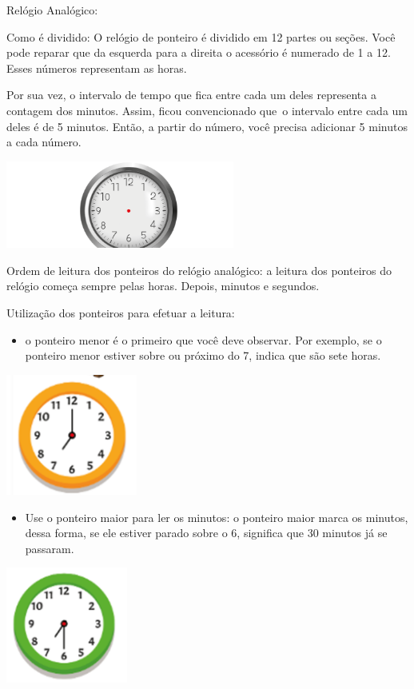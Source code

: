 Relógio Analógico:

Como é dividido: O relógio de ponteiro é dividido em 12 partes ou
seções. Você pode reparar que da esquerda para a direita o acessório é
numerado de 1 a 12. Esses números representam as horas.

Por sua vez, o intervalo de tempo que fica entre cada um deles
representa a contagem dos minutos. Assim, ficou convencionado que~o
intervalo entre cada um deles é de 5 minutos. Então, a partir do número,
você precisa adicionar 5 minutos a cada número.

\includegraphics[width=2.95833in,height=1.13007in]{media/image48.png}

Ordem de leitura dos ponteiros do relógio analógico: a leitura dos
ponteiros do relógio começa sempre pelas horas. Depois, minutos e
segundos.

Utilização dos ponteiros para efetuar a leitura:

\begin{itemize}
\item
  o ponteiro menor é o primeiro que você deve observar. Por exemplo, se
  o ponteiro menor estiver sobre ou próximo do 7, indica que são sete
  horas.
\end{itemize}

\includegraphics[width=1.69271in,height=1.56563in]{media/image49.png}

\begin{itemize}
\item
  Use o ponteiro maior para ler os minutos: o ponteiro maior marca os
  minutos, dessa forma, se ele estiver parado sobre o 6, significa que
  30 minutos já se passaram.
\end{itemize}

\includegraphics[width=1.57292in,height=1.50032in]{media/image50.png}

